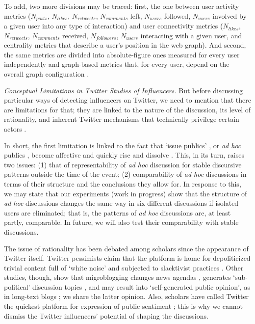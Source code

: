 To add, two more divisions may be traced: first, the one between user activity metrics (\(N_{posts}\), \(N_{likes}\), \(N_{retweets}\), \(N_{comments}\) left, \(N_{users}\) followed, \(N_{users}\) involved by a given user into any type of interaction) and user connectivity metrics (\(N_{likes}\), \(N_{retweets}\), \(N_{comments}\) received, \(N_{followers}\), \(N_{users}\) interacting with a given user, and centrality metrics that describe a user’s position in the web graph). And second, the same metrics are divided into absolute-figure ones measured for every user independently and graph-based metrics that, for every user, depend on the overall graph configuration \cite{BodrunovaLitvinenkoBlekanov2016}.

\textit{Conceptual Limitations in Twitter Studies of Influencers.} But before discussing particular ways of detecting influencers on Twitter, we need to mention that there are limitations for that; they are linked to the nature of the discussion, its level of rationality, and inherent Twitter mechanisms that technically privilege certain actors \cite{BodrunovaLitvinenkoBlekanov2016}.

In short, the first limitation is linked to the fact that ‘issue publics’ \cite[p.~422]{Habermas} \cite[p.~108]{VanDeursenVanDijk}, or \textit{ad hoc} publics \cite{BrunsBurgess}, become affective \cite{Papacharissi} and quickly rise and dissolve \cite[p.~74]{Dahlgren}. This, in its turn, raises two issues: (1) that of representability of \textit{ad hoc} discussion for stable discursive patterns outside the time of the event; (2) comparability of \textit{ad hoc} discussions in terms of their structure and the conclusions they allow for. In response to this, we may state that our experiments (work in progress) show that the structure of \textit{ad hoc} discussions changes the same way in six different discussions if isolated users are eliminated; that is, the patterns of \textit{ad hoc} discussions are, at least partly, comparable. In future, we will also test their comparability with stable discussions.

The issue of rationality has been debated among scholars since the appearance of Twitter itself. Twitter pessimists claim that the platform is home for depoliticized trivial content full of ‘white noise’ \cite{HartleyGreen} and subjected to slacktivist practices \cite{Morozov}. Other studies, though, show that migroblogging changes news agendas \cite{BroersmaGraham}, generates ‘sub-political’ discussion topics \cite{LindgrenLundstrom}, and may result into ‘self-generated public opinion’, as in long-text blogs \cite{KoltsovaKoltcov}; we share the latter opinion. Also, scholars have called Twitter the quickest platform for expression of public sentiment \cite{BrunsBurgessCrawford}; this is why we cannot dismiss the Twitter influencers’ potential of shaping the discussions.

